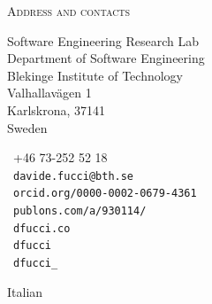 \documentclass[9pt]{article}
\makeatletter
\def\myemail{davide.fucci@bth.se}
\def\myphone{+46 73-252 52 18}
\def\mypublons{publons.com/a/930114/}
\def\myorcid{orcid.org/0000-0002-0679-4361}
\makeatother
\begin{document}
\reversemarginpar
 \noindent\textsc{Address and contacts}\\
 \begin{minipage}[t]{2in}
 {\footnotesize Software Engineering Research Lab\vspace{-0.04in}\\
 \noindent Department of Software Engineering \vspace{-0.04in}\\
 \noindent Blekinge Institute of Technology \vspace{-0.01in}\\
 \noindent Valhallavägen 1 \vspace{-0.04in}\\
 \noindent Karlskrona, 37141 \vspace{-0.04in}\\
 \noindent Sweden
 }
 \end{minipage}
 \begin{minipage}[t]{1.7in}
   {\footnotesize \faPhone~\myphone \\
   \noindent \faEnvelope~\texttt{\myemail}\vspace{-0.03in}\\
   \noindent \aiOrcid~\texttt{\myorcid} \vspace{-0.03in}\\
   \noindent \aiPublonsSquare~\texttt{\mypublons} \vspace{-0.03in}\\
    \noindent \faSitemap~\texttt{dfucci.co} \vspace{-0.03in}\\
   \noindent \faGithub~\texttt{dfucci} \vspace{-0.03in}\\
  \noindent  \faTwitter~\texttt{dfucci\_}
  }
 \end{minipage}


 \bigskip
 \bigskip
 \bigskip
\flushleft
%

\medskip
\bigskip


 \noindent Italian

 \medskip

\textheight=580pt
\end{document}
